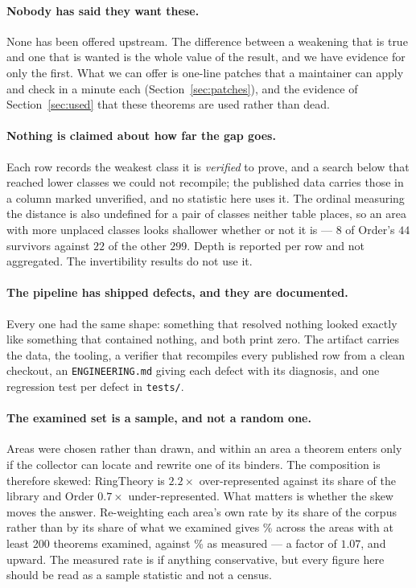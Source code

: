 \documentclass[11pt]{article}
\begin{document}
\paragraph{Nobody has said they want these.} None has been offered upstream. The
difference between a weakening that is true and one that is wanted is the whole
value of the result, and we have evidence for only the first. What we can offer
is \patchKept{} one-line patches that a maintainer can apply and check in a
minute each (Section~\ref{sec:patches}), and the evidence of
Section~\ref{sec:used} that these theorems are used rather than dead.

\paragraph{Nothing is claimed about how far the gap goes.} Each row records the
weakest class it is \emph{verified} to prove, and a search below that reached
lower classes we could not recompile; the published data carries those in a
column marked unverified, and no statistic here uses it. The ordinal measuring
the distance is also undefined for a pair of classes neither table places, so an
area with more unplaced classes looks shallower whether or not it is --- $8$ of
Order's $44$ survivors against $22$ of the other $299$. Depth is reported per
row and not aggregated. The invertibility results do not use it.

\paragraph{The pipeline has shipped defects, and they are documented.} Every one
had the same shape: something that resolved nothing looked exactly like
something that contained nothing, and both print zero. The artifact
\cite{artifact} carries the data, the tooling, a verifier that recompiles every
published row from a clean checkout, an \texttt{ENGINEERING.md} giving each
defect with its diagnosis, and one regression test per defect in
\texttt{tests/}.

\paragraph{The examined set is a sample, and not a random one.}
Areas were chosen rather than drawn, and within an area a theorem enters only
if the collector can locate and rewrite one of its binders. The composition is
therefore skewed: RingTheory is $2.2\times$ over-represented against its share
of the library and Order $0.7\times$ under-represented. What matters is whether
the skew moves the answer. Re-weighting each area's own rate by its share of the
corpus rather than by its share of what we examined gives \reweightedRate{}\%
across the \reweightAreas{} areas with at least 200 theorems examined, against
\theoremRate{}\% as measured --- a factor of $1.07$, and upward. The measured
rate is if anything conservative, but every figure here should be read as a
sample statistic and not a census.
\end{document}
